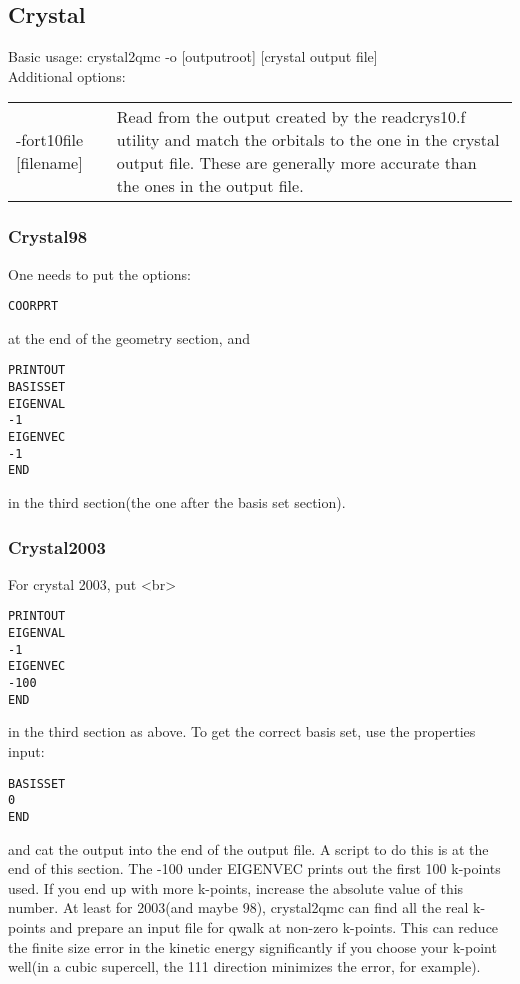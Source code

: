 \documentclass[12pt]{article}
\begin{document}
\newpage
\subsection{Crystal}


Basic usage:  crystal2qmc -o [outputroot]  [crystal output file] \\
Additional options: \\
\begin{tabular}{lp{8cm}}
-fort10file [filename]  &  Read from the output created by the 
readcrys10.f utility and match the orbitals to the one in
the crystal output file.  These are generally more accurate than the ones
in the output file. \\
\end{tabular}



\subsubsection{Crystal98}

One needs to put the options: \\
\begin{verbatim}
COORPRT
\end{verbatim}
at the end of the geometry section, and \\
\begin{verbatim}
PRINTOUT
BASISSET
EIGENVAL
-1
EIGENVEC
-1
END
\end{verbatim}
in the third section(the one after the basis set section). 

\subsubsection{Crystal2003}

 For crystal 2003, put <br>
\begin{verbatim}
PRINTOUT
EIGENVAL
-1
EIGENVEC
-100
END
\end{verbatim}
in the third section as above.  To get the correct basis set, use the properties input: \\
\begin{verbatim}
BASISSET
0
END
\end{verbatim}
and cat the output into the end of the output file.  A script to do this is at the end of this section.
The -100 under EIGENVEC prints out the first 100 k-points used.  If you end up with more k-points, 
increase the absolute value of this number.  At least for 2003(and maybe 98), crystal2qmc can find all the
real k-points and prepare an input file for qwalk at non-zero k-points.  This can reduce the finite
size error in the kinetic energy significantly if you choose your k-point well(in a cubic supercell, the 
111 direction minimizes the error, for example).
\end{document}
